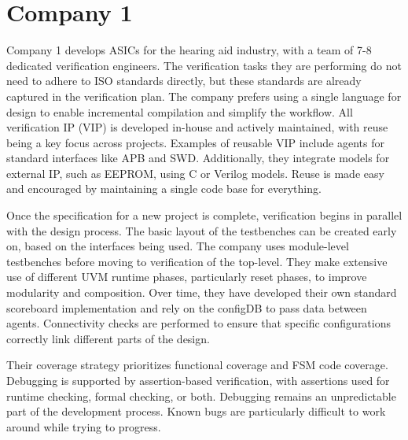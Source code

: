 \documentclass[11pt]{report}
\begin{document}
\begin{comment}
Reuse
- how extensively do you use more complex inheritance to allow for reuse

# Open criticism

Criticism
- what limitations of uvm have you encountered
- Are there any language limitations that you encounter while developing your verification environment? If so, how do you work around them?
- did you have any use case where you needed to adapt your verification methods?
\end{comment}

\section{Company 1} %

Company 1 develops ASICs for the hearing aid industry, with a team of 7-8 dedicated verification engineers. The
verification tasks they are performing do not need to adhere to ISO standards directly, but these standards are
already captured in the verification plan. The company prefers using a single language for design to enable
incremental compilation and simplify the workflow. All verification IP (VIP) is developed in-house and actively
maintained, with reuse being a key focus across projects. Examples of reusable VIP include agents for standard interfaces like
APB and SWD. Additionally, they integrate models for external IP, such as EEPROM, using C or Verilog models. Reuse is
made easy and encouraged by maintaining a single code base for everything.

Once the specification for a new project is complete, verification begins in parallel with the design process. The
basic layout of the testbenches can be created early on, based on the interfaces being used. The company uses
module-level testbenches before moving to verification of the top-level. They make extensive use of different UVM
runtime phases, particularly reset phases, to improve modularity and composition. Over time, they have developed
their own standard scoreboard implementation and rely on the configDB to pass data between agents. Connectivity
checks are performed to ensure that specific configurations correctly link different parts of the design.

Their coverage strategy prioritizes functional coverage and FSM code coverage. Debugging is supported by
assertion-based verification, with assertions used for runtime checking, formal checking, or both. Debugging remains
an unpredictable part of the development process. Known bugs are particularly difficult to work around while trying to progress.
\end{document}
